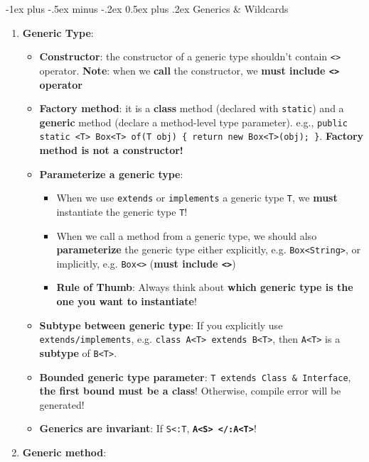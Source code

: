 \documentclass[10pt, landscape]{article}
\makeatletter
\renewcommand{\section}{\@startsection{section}{1}{0mm}%
                                {-1ex plus -.5ex minus -.2ex}%
                                {0.5ex plus .2ex}%
                                {\normalfont\large\bfseries}}
\makeatother
\begin{document}
\begin{multicols}{4}
\section{Generics \& Wildcards}
\begin{enumerate}
    \item \textbf{Generic Type}:
    \begin{itemize}
        \item \textbf{Constructor}: the constructor of a generic type shouldn't contain \texttt{<>} operator. \textbf{Note}: when we \textbf{call} the constructor, we \textbf{must include \texttt{<>} operator}
        \item \textbf{Factory method}: it is a \textbf{class} method (declared with \texttt{static}) and a \textbf{generic} method (declare a method-level type parameter). e.g., \texttt{public static <T> Box<T> of(T obj) \{ return new Box<T>(obj); \}}. \textbf{Factory method is not a constructor!}
        \item \textbf{Parameterize a generic type}:
        \begin{itemize}
            \item When we use \texttt{extends} or \texttt{implements} a generic type \texttt{T}, we \textbf{must} instantiate the generic type \texttt{T}!
            \item When we call a method from a generic type, we should also \textbf{parameterize} the generic type either explicitly, e.g. \texttt{Box<String>}, or implicitly, e.g. \texttt{Box<>} (\textbf{must include \texttt{<>}})
            \item \textbf{Rule of Thumb}: Always think about \textbf{which generic type is the one you want to instantiate}!
        \end{itemize}
        \item \textbf{Subtype between generic type}: If you explicitly use \texttt{extends/implements}, e.g. \texttt{class A<T> extends B<T>}, then \texttt{A<T>} is a \textbf{subtype} of \texttt{B<T>}.
        \item \textbf{Bounded generic type parameter}: \texttt{T extends Class \& Interface}, \textbf{the first bound must be a class}! Otherwise, compile error will be generated!
        \item \textbf{Generics are invariant}: If \texttt{S<:T}, \textbf{\texttt{A<S> </:A<T>}}!
    \end{itemize}
    \item \textbf{Generic method}:
    \begin{itemize}

\end{itemize}
\end{enumerate}
\end{multicols}
\end{document}
